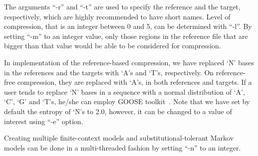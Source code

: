 The arguments ``-r'' and ``-t'' are used to specify the reference and the target, respectively, which are highly recommended to have short names. 
Level of compression, that is an integer between 0 and 5, can be determined with ``-l''. 
By setting ``-m'' to an integer value, only those regions in the reference file that are bigger than that value would be able to be considered for compression.

In implementation of the reference-based compression, we have replaced `N' bases in the references and the targets with `A's and `T's, respectively. On reference-free compression, they are replaced with `A's, in both references and targets. If a user tends to replace `N' bases in a sequence with a normal distribution of `A', `C', `G' and `T's, he/she can employ GOOSE toolkit~\cite{web-goose}. Note that we have set by default the entropy of `N's to 2.0, however, it can be changed to a value of interest using ``-e'' option.

Creating multiple finite-context models and substitutional-tolerant Markov models can be done in a multi-threaded fashion by setting ``-n'' to an integer. 

